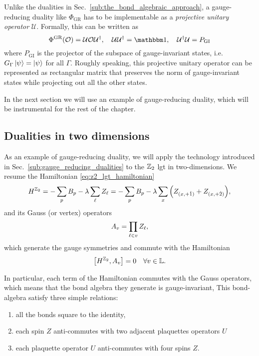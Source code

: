 Unlike the dualities in Sec.~\ref{sub:the_bond_algebraic_approach}, a gauge-reducing duality like $\Phi_{\text{GR}}$ has to be implementable as a \emph{projective unitary operator} $\mathcal{U}$.
Formally, this can be written as
\begin{equation}
    \Phi^{\text{GR}} ( \mathcal{O} ) = \mathcal{U} \mathcal{O} \mathcal{U}^\dagger, \quad
    \mathcal{U} \mathcal{U}^\dagger = \identity, \quad
    \mathcal{U}^\dagger \mathcal{U} = P_{\text{GI}}
\end{equation}
where $P_{\text{GI}}$ is the projector of the subspace of gauge-invariant states, i.e.~$G_{\Gamma} \ket{\psi} = \ket{\psi}$ for all $\Gamma$.
Roughly speaking, this projective unitary operator can be represented as rectangular matrix that preserves the norm of gauge-invariant states while projecting out all the other states.

In the next section we will use an example of gauge-reducing duality, which will be instrumental for the rest of the chapter.



\subsection{Dualities in two dimensions}
\label{sub:dualities_in_two_dimensions}


As an example of gauge-reducing duality, we will apply the technology introduced in Sec.~\ref{sub:gauge_reducing_dualities} to the $\mathbb{Z}_2$ \ac{lgt} in two-dimensions.
We resume the Hamiltonian \eqref{eq:z2_lgt_hamiltonian}
\begin{equation}
    H^{\mathbb{Z}_2}
    = - \sum_{p} B_p - \lambda \sum_{\ell} Z_{\ell}
    = - \sum_{p} B_p - \lambda \sum_{x} \qty(Z_{(x, +\hat{1})} + Z_{(x, +\hat{2})}),
    \label{eq:hamiltonian_z2_2d}
\end{equation}
and its Gauss (or vertex) operators
\begin{equation}
    A_v = \prod_{\ell \in v}  Z_{\ell},
\end{equation}
which generate the gauge symmetries and commute with the Hamiltonian
\begin{equation*}
    \comm{H^{\Z_2}}{A_v} = 0 \quad \forall v \in \Lattice.
\end{equation*}

In particular, each term of the Hamiltonian commutes with the Gauss operators, which means that the bond algebra they generate is gauge-invariant,
This bond-algebra satisfy three simple relations:
\begin{enumerate}[label=(\roman*)]
    \item all the bonds square to the identity,
    \item each spin $Z$ anti-commutes with two adjacent plaquettes operators $U$
    \item each plaquette operator $U$ anti-commutes with four spins $Z$.
\end{enumerate}

